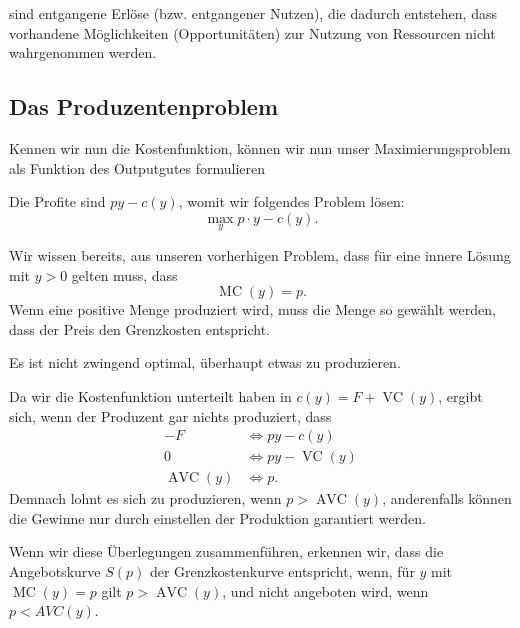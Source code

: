 \begin{definition} 
	 sind entgangene Erlöse (bzw. entgangener Nutzen), die dadurch entstehen, dass vorhandene Möglichkeiten (Opportunitäten) zur Nutzung von Ressourcen nicht wahrgenommen werden.
\end{definition}


\subsection{Das Produzentenproblem}

Kennen wir nun die Kostenfunktion, können wir nun unser Maximierungsproblem als Funktion des Outputgutes formulieren

\begin{construction}
	Die Profite sind $py - c(y)$, womit wir folgendes Problem lösen:
	\[
		\max_{y} p \cdot  y - c(y)
		.\]
\end{construction}

Wir wissen bereits, aus unseren vorherhigen Problem, dass für eine innere Lösung mit $y > 0$ gelten muss, dass
\[
	\operatorname{MC} (y) = p
	.\]
Wenn eine positive Menge produziert wird, muss die Menge so gewählt
werden, dass der Preis den Grenzkosten entspricht.

\begin{remark}
	Es ist nicht zwingend optimal, überhaupt etwas zu produzieren.
\end{remark}

Da wir die Kostenfunktion unterteilt haben in $c(y) = F + \operatorname{VC}(y)$, ergibt sich, wenn der Produzent gar nichts produziert, dass
\begin{align*}
	-F                    & \iff py - c(y)                  \\
	0                     & \iff py -  \operatorname{VC}(y) \\
	\operatorname{AVC}(y) & \iff p
	.\end{align*}
Demnach lohnt es sich zu produzieren, wenn $p > \operatorname{AVC}(y)$, anderenfalls können die Gewinne nur durch einstellen der Produktion garantiert werden.


\noindent Wenn wir diese Überlegungen zusammenführen, erkennen wir, dass die
Angebotskurve $S(p)$ der Grenzkostenkurve entspricht, wenn, für $y$ mit
$\operatorname{MC}(y) = p$ gilt $p >\operatorname{AVC}(y)$, und nicht angeboten wird, wenn
$p <AVC (y )$.



